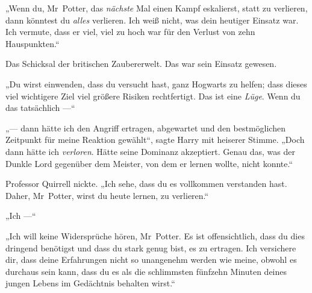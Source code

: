 „Wenn du, Mr~Potter, das \emph{nächste} Mal einen Kampf eskalierst, statt zu verlieren, dann könntest du \emph{alles} verlieren. Ich weiß nicht, was dein heutiger Einsatz war. Ich vermute, dass er viel, viel zu hoch war für den Verlust von zehn Hauspunkten.“

Das Schicksal der britischen Zaubererwelt. Das war sein Einsatz gewesen.

„Du wirst einwenden, dass du versucht hast, ganz Hogwarts zu helfen; dass dieses viel wichtigere Ziel viel größere Risiken rechtfertigt. Das ist eine \emph{Lüge}. Wenn du das tatsächlich —“

„— dann hätte ich den Angriff ertragen, abgewartet und den bestmöglichen Zeitpunkt für meine Reaktion gewählt“, sagte Harry mit heiserer Stimme.
„Doch dann hätte ich \emph{verloren}. Hätte seine Dominanz akzeptiert. Genau das, was der Dunkle Lord gegenüber dem Meister, von dem er lernen wollte, nicht konnte.“

Professor Quirrell nickte.
„Ich sehe, dass du es vollkommen verstanden hast. Daher, Mr~Potter, wirst du heute lernen, zu verlieren.“

„Ich —“

„Ich will keine Widersprüche hören, Mr~Potter. Es ist offensichtlich, dass du dies dringend benötigst und dass du stark genug bist, es zu ertragen. Ich versichere dir, dass deine Erfahrungen nicht so unangenehm werden wie meine, obwohl es durchaus sein kann, dass du es als die schlimmsten fünfzehn Minuten deines jungen Lebens im Gedächtnis behalten wirst.“

